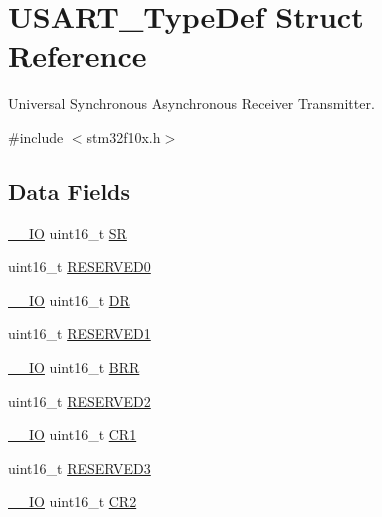 \hypertarget{struct_u_s_a_r_t___type_def}{}\section{U\+S\+A\+R\+T\+\_\+\+Type\+Def Struct Reference}
\label{struct_u_s_a_r_t___type_def}


Universal Synchronous Asynchronous Receiver Transmitter.  




{\ttfamily \#include $<$stm32f10x.\+h$>$}

\subsection*{Data Fields}
\begin{DoxyCompactItemize}
\item 
\mbox{\hyperlink{core__sc300_8h_aec43007d9998a0a0e01faede4133d6be}{\+\_\+\+\_\+\+IO}} uint16\+\_\+t \mbox{\hyperlink{struct_u_s_a_r_t___type_def_a44962ea5442d203bf4954035d1bfeb9d}{SR}}
\item 
uint16\+\_\+t \mbox{\hyperlink{struct_u_s_a_r_t___type_def_a149feba01f9c4a49570c6d88619f504f}{R\+E\+S\+E\+R\+V\+E\+D0}}
\item 
\mbox{\hyperlink{core__sc300_8h_aec43007d9998a0a0e01faede4133d6be}{\+\_\+\+\_\+\+IO}} uint16\+\_\+t \mbox{\hyperlink{struct_u_s_a_r_t___type_def_a0a1acc0425516ff7969709d118b96a3b}{DR}}
\item 
uint16\+\_\+t \mbox{\hyperlink{struct_u_s_a_r_t___type_def_a8249a3955aace28d92109b391311eb30}{R\+E\+S\+E\+R\+V\+E\+D1}}
\item 
\mbox{\hyperlink{core__sc300_8h_aec43007d9998a0a0e01faede4133d6be}{\+\_\+\+\_\+\+IO}} uint16\+\_\+t \mbox{\hyperlink{struct_u_s_a_r_t___type_def_af0ba3d82d524fddbe0fb3309788e2954}{B\+RR}}
\item 
uint16\+\_\+t \mbox{\hyperlink{struct_u_s_a_r_t___type_def_a5573848497a716a9947fd87487709feb}{R\+E\+S\+E\+R\+V\+E\+D2}}
\item 
\mbox{\hyperlink{core__sc300_8h_aec43007d9998a0a0e01faede4133d6be}{\+\_\+\+\_\+\+IO}} uint16\+\_\+t \mbox{\hyperlink{struct_u_s_a_r_t___type_def_a61400ce239355b62aa25c95fcc18a5e1}{C\+R1}}
\item 
uint16\+\_\+t \mbox{\hyperlink{struct_u_s_a_r_t___type_def_a6c3b31022e6f59b800e9f5cc2a89d54c}{R\+E\+S\+E\+R\+V\+E\+D3}}
\item 
\mbox{\hyperlink{core__sc300_8h_aec43007d9998a0a0e01faede4133d6be}{\+\_\+\+\_\+\+IO}} uint16\+\_\+t \mbox{\hyperlink{struct_u_s_a_r_t___type_def_a2a3e81bd118d1bc52d24a0b0772e6a0c}{C\+R2}}

\end{DoxyCompactItemize}

